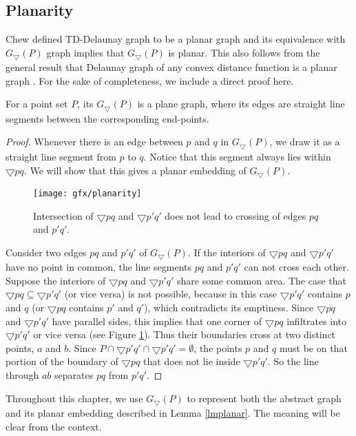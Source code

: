 \subsection{Planarity}
Chew defined \cite{Chew1989} TD-Delaunay graph to be a planar graph and its equivalence with $G_\bigtriangledown(P)$ graph implies that 
$G_\bigtriangledown(P)$ is planar. This also follows from the general result that Delaunay graph of any convex distance function is a 
planar graph \cite{Bose}. For the sake of completeness, we include a direct proof here.   
\begin{lemma}\label{lmplanar}
 For a point set $P$, its $G_\bigtriangledown(P)$ is a plane graph, where its edges are straight line segments between the corresponding 
end-points.
\end{lemma}
\begin{proof}
Whenever there is an edge between $p$ and $q$ in $G_\bigtriangledown(P)$, we draw it as a straight line segment from $p$ to $q$. 
Notice that this segment always lies within $\bigtriangledown pq$. We will show that this gives a planar embedding of $G_\bigtriangledown(P)$. 
\begin{figure}[h]
\centering
 \texttt{[image: gfx/planarity]}   %
  \caption{Intersection of $\bigtriangledown pq$ and $\bigtriangledown p'q'$ does not lead to crossing of edges $pq$ and $p'q'$.}
\label{planarity}
 \end{figure}
Consider two edges $pq$ and $p'q'$ of $G_\bigtriangledown(P)$. If the interiors of $\bigtriangledown pq$ and $\bigtriangledown p'q'$ have no point in 
common, the line segments $pq$ and $p'q'$ can not cross each other. Suppose the interiors of $\bigtriangledown pq$ and $\bigtriangledown p'q'$ 
share some common area. The case that $\bigtriangledown pq \subseteq \bigtriangledown p'q'$ (or vice versa) is not possible, because in this 
case $\bigtriangledown p'q'$ contains $p$ and $q$ (or $\bigtriangledown pq$ contains $p'$ and $q'$), which contradicts its emptiness. 
Since $\bigtriangledown pq$ and $\bigtriangledown p'q'$ have parallel sides, this implies that one corner of $\bigtriangledown pq$ infiltrates 
into $\bigtriangledown p'q'$ or vice versa (see Figure \ref{planarity}). Thus their boundaries cross at two distinct points, $a$ and $b$. 
Since $P \cap \bigtriangledown p'q' \cap \bigtriangledown p'q' =\emptyset$, the points $p$ and $q$ must be on that portion of the boundary 
of $\bigtriangledown pq$ that does not 
lie inside $\bigtriangledown p'q'$. So the 
line through $ab$ separates $pq$ from $p'q'$. 
\end{proof}
Throughout this chapter, we use $G_\bigtriangledown(P)$ to represent both the abstract graph and its planar embedding described in Lemma \ref{lmplanar}. 
The meaning will be clear from the context.
